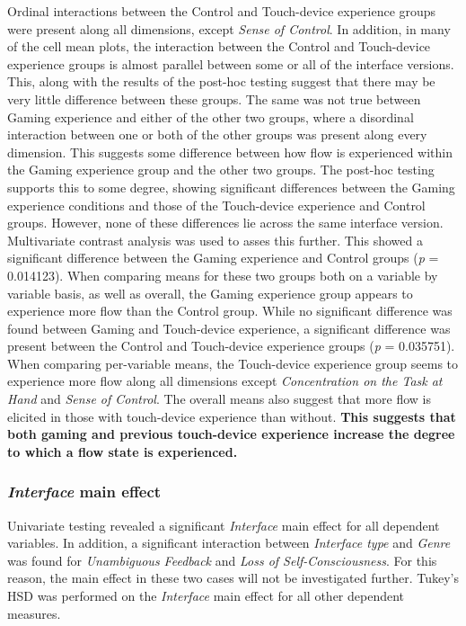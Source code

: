 Ordinal interactions between the Control and Touch-device experience groups were present along all dimensions, except \emph{Sense of Control}. In addition, in many of the cell mean plots, the interaction between the Control and Touch-device experience groups is almost parallel between some or all of the interface versions. This, along with the results of the post-hoc testing suggest that there may be very little difference between these groups. The same was not true between Gaming experience and either of the other two groups, where a disordinal interaction between one or both of the other groups was present along every dimension. This suggests some difference between how flow is experienced within the Gaming experience group and the other two groups. The post-hoc testing supports this to some degree, showing significant differences between the Gaming experience conditions and those of the Touch-device experience and Control groups. However, none of these differences lie across the same interface version. Multivariate contrast analysis was used to asses this further. This showed a significant difference between the Gaming experience and Control groups (\emph{p} = 0.014123). When comparing means for these two groups both on a variable by variable basis, as well as overall, the Gaming experience group appears to experience more flow than the Control group. While no significant difference was found between Gaming and Touch-device experience, a significant difference was present between the Control and Touch-device experience groups (\emph{p} = 0.035751). When comparing per-variable means, the Touch-device experience group seems to experience more flow along all dimensions except \emph{Concentration on the Task at Hand} and \emph{Sense of Control}. The overall means also suggest that more flow is elicited in those with touch-device experience than without. {\bf This suggests that both gaming and previous touch-device experience increase the degree to which a flow state is experienced.}

\subsubsection{\emph{Interface} main effect}
Univariate testing revealed a significant \emph{Interface} main effect for all dependent variables. In addition, a significant interaction between \emph{Interface type} and \emph{Genre} was found for \emph{Unambiguous Feedback} and \emph{Loss of Self-Consciousness}. For this reason, the main effect in these two cases will not be investigated further. Tukey's HSD was performed on the \emph{Interface} main effect for all other dependent measures.

